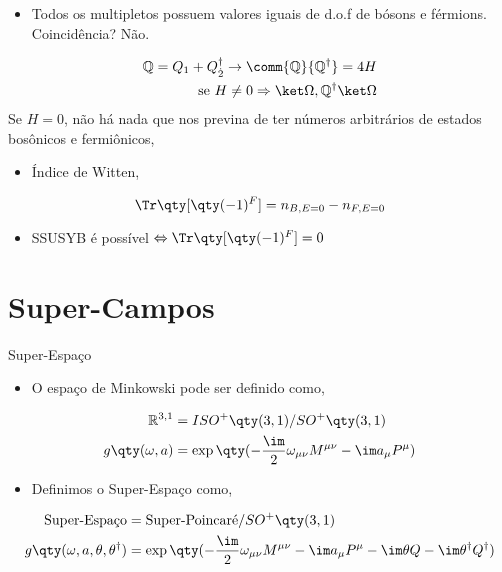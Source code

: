 \documentclass{beamer}
\begin{document}
\begin{frame}
    \begin{itemize}
        \item Todos os multipletos possuem valores iguais de d.o.f de bósons e férmions. Coincidência? \pause Não.
    \end{itemize}
    \begin{align*}
        \mathbb Q=Q_1+Q^\dagger_{\dot 2}\rightarrow \comm{\mathbb Q}{\mathbb Q^\dagger}=4H\\
        \textnormal{se }H\neq0\Rightarrow\ket \Omega, \mathbb Q^\dagger\ket \Omega
    \end{align*}
    Se $H=0$, não há nada que nos previna de ter números arbitrários de estados bosônicos e fermiônicos,
    \begin{itemize}
        \item Índice de Witten, 
    \end{itemize}
    \[\Tr\qty[\qty(-1)^F]=n_{B,E=0}-n_{F,E=0}\]
    \begin{itemize}
        \item SSUSYB é possível $\Leftrightarrow\Tr\qty[\qty(-1)^F]=0$
    \end{itemize}
\end{frame}

\section{Super-Campos}

\begin{frame}{Super-Espaço}
    \begin{itemize}
        \item O espaço de Minkowski pode ser definido como,
    \end{itemize}
    \begin{align*}
        \mathbb R^{3,1}&=ISO^+\qty(3,1)/SO^+\qty(3,1)\\
        g\qty(\omega,a)&=\exp\qty(-\frac\im2\omega_{\mu\nu}M^{\mu\nu}-\im a_\mu P^\mu)
    \end{align*}
    \begin{itemize}\pause
        \item Definimos o Super-Espaço como,
    \end{itemize}    
    \begin{align*}
        \textnormal{Super-Espaço}&=\textnormal{Super-Poincaré}/SO^+\qty(3,1)\\
        g\qty(\omega,a,\theta,\theta^\dagger)&=\exp\qty(-\frac\im2\omega_{\mu\nu}M^{\mu\nu}-\im a_\mu P^\mu-\im\theta Q-\im\theta^\dagger Q^\dagger)
    \end{align*}
\end{frame}
\end{document}
